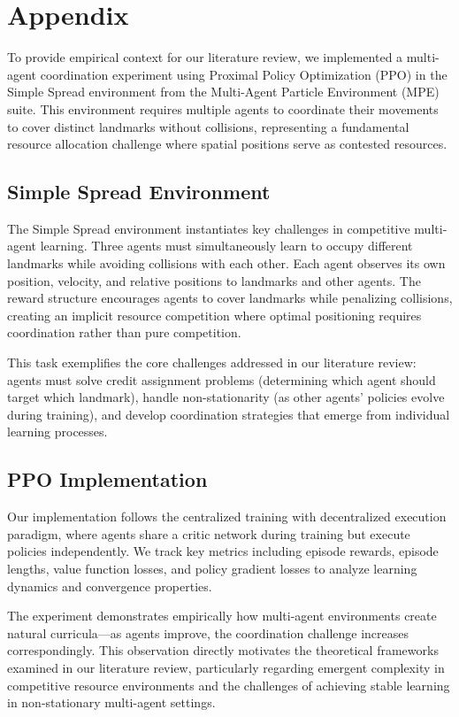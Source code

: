 \appendix

\section{Appendix}\label{app}

To provide empirical context for our literature review, we implemented a multi-agent coordination experiment using Proximal Policy Optimization (PPO) in the Simple Spread environment from the Multi-Agent Particle Environment (MPE) suite. This environment requires multiple agents to coordinate their movements to cover distinct landmarks without collisions, representing a fundamental resource allocation challenge where spatial positions serve as contested resources.

\subsection{Simple Spread Environment}

The Simple Spread environment instantiates key challenges in competitive multi-agent learning. Three agents must simultaneously learn to occupy different landmarks while avoiding collisions with each other. Each agent observes its own position, velocity, and relative positions to landmarks and other agents. The reward structure encourages agents to cover landmarks while penalizing collisions, creating an implicit resource competition where optimal positioning requires coordination rather than pure competition.

This task exemplifies the core challenges addressed in our literature review: agents must solve credit assignment problems (determining which agent should target which landmark), handle non-stationarity (as other agents' policies evolve during training), and develop coordination strategies that emerge from individual learning processes.

\subsection{PPO Implementation}

Our implementation follows the centralized training with decentralized execution paradigm, where agents share a critic network during training but execute policies independently. We track key metrics including episode rewards, episode lengths, value function losses, and policy gradient losses to analyze learning dynamics and convergence properties.

The experiment demonstrates empirically how multi-agent environments create natural curricula—as agents improve, the coordination challenge increases correspondingly. This observation directly motivates the theoretical frameworks examined in our literature review, particularly regarding emergent complexity in competitive resource environments and the challenges of achieving stable learning in non-stationary multi-agent settings.

